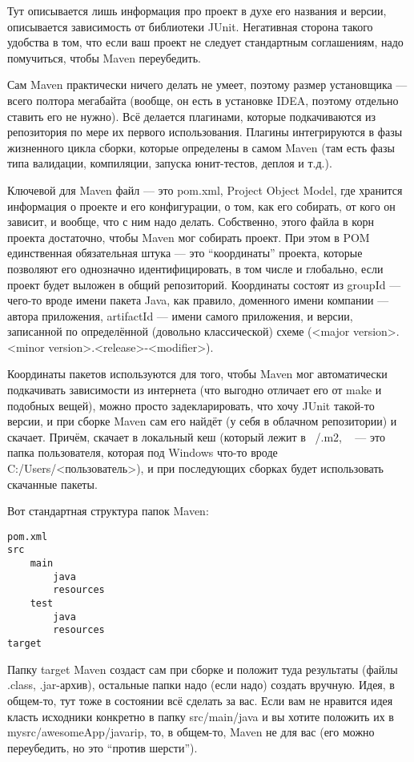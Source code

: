 \documentclass[a5paper]{article}
\begin{document}
Тут описывается лишь информация про проект в духе его названия и версии, описывается зависимость от библиотеки JUnit. Негативная сторона такого удобства в том, что если ваш проект не следует стандартным соглашениям, надо помучиться, чтобы Maven переубедить.

Сам Maven практически ничего делать не умеет, поэтому размер установщика --- всего полтора мегабайта (вообще, он есть в установке IDEA, поэтому отдельно ставить его не нужно). Всё делается плагинами, которые подкачиваются из репозитория по мере их первого использования. Плагины интегрируются в фазы жизненного цикла сборки, которые определены в самом Maven (там есть фазы типа валидации, компиляции, запуска юнит-тестов, деплоя и т.д.). 

Ключевой для Maven файл --- это pom.xml, Project Object Model, где хранится информация о проекте и его конфигурации, о том, как его собирать, от кого он зависит, и вообще, что с ним надо делать. Собственно, этого файла в корн проекта достаточно, чтобы Maven мог собирать проект. При этом в POM единственная обязательная штука --- это ``координаты'' проекта, которые позволяют его однозначно идентифицировать, в том числе и глобально, если проект будет выложен в общий репозиторий. Координаты состоят из groupId --- чего-то вроде имени пакета Java, как правило, доменного имени компании --- автора приложения, artifactId --- имени самого приложения, и версии, записанной по определённой (довольно классической) схеме (<major version>.<minor version>.<release>-<modifier>).

Координаты пакетов используются для того, чтобы Maven мог автоматически подкачивать зависимости из интернета (что выгодно отличает его от make и подобных вещей), можно просто задекларировать, что хочу JUnit такой-то версии, и при сборке Maven сам его найдёт (у себя в облачном репозитории) и скачает. Причём, скачает в локальный кеш (который лежит в ~/.m2, ~ --- это папка пользователя, которая под Windows что-то вроде  C:/Users/<пользователь>), и при последующих сборках будет использовать скачанные пакеты.

Вот стандартная структура папок Maven:

\begin{verbatim}
pom.xml
src
    main
        java
        resources
    test
        java
        resources
target
\end{verbatim}

Папку target Maven создаст сам при сборке и положит туда результаты (файлы .class, .jar-архив), остальные папки надо (если надо) создать вручную. Идея, в общем-то, тут тоже в состоянии всё сделать за вас. Если вам не нравится идея класть исходники конкретно в папку src/main/java и вы хотите положить их в mysrc/awesomeApp/javarip, то, в общем-то, Maven не для вас (его можно переубедить, но это ``против шерсти'').
\end{document}
